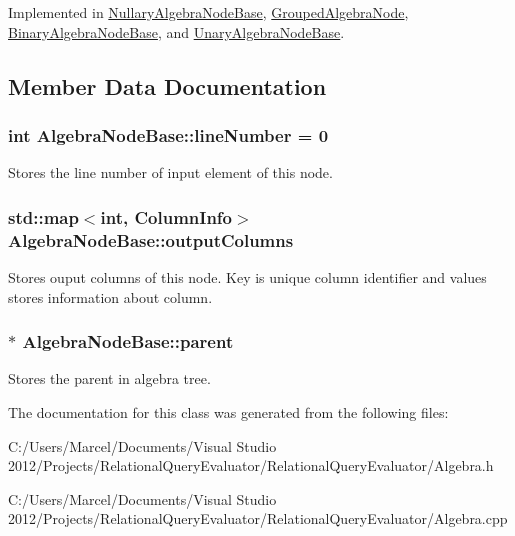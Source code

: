 Implemented in \hyperlink{class_nullary_algebra_node_base_af5a5e7f02db8509605ab852ef65b201b}{Nullary\+Algebra\+Node\+Base}, \hyperlink{class_grouped_algebra_node_a463e6303f6332fc9ed2a885e3456b58e}{Grouped\+Algebra\+Node}, \hyperlink{class_binary_algebra_node_base_a6e466b62966a9851c3c34e1fb588a496}{Binary\+Algebra\+Node\+Base}, and \hyperlink{class_unary_algebra_node_base_a26aeeaeb45f97051d618cfcceccd5949}{Unary\+Algebra\+Node\+Base}.



\subsection{Member Data Documentation}
\hypertarget{class_algebra_node_base_ac98b5887b911ee27411307c94db7fc94}{
\subsubsection[{line\+Number}]{\setlength{\rightskip}{0pt plus 5cm}int Algebra\+Node\+Base\+::line\+Number = 0}}\label{class_algebra_node_base_ac98b5887b911ee27411307c94db7fc94}
Stores the line number of input element of this node. \hypertarget{class_algebra_node_base_ac59c590aea4f109c7fab18f714c588c1}{
\subsubsection[{output\+Columns}]{\setlength{\rightskip}{0pt plus 5cm}std\+::map$<$int, {\bf Column\+Info}$>$ Algebra\+Node\+Base\+::output\+Columns}}\label{class_algebra_node_base_ac59c590aea4f109c7fab18f714c588c1}
Stores ouput columns of this node. Key is unique column identifier and values stores information about column. \hypertarget{class_algebra_node_base_a5b2834cce900dec172763d4ef4b38f66}{
\subsubsection[{parent}]{$\ast$ Algebra\+Node\+Base\+::parent}}\label{class_algebra_node_base_a5b2834cce900dec172763d4ef4b38f66}
Stores the parent in algebra tree. 

The documentation for this class was generated from the following files\+:\begin{DoxyCompactItemize}
\item 
C\+:/\+Users/\+Marcel/\+Documents/\+Visual Studio 2012/\+Projects/\+Relational\+Query\+Evaluator/\+Relational\+Query\+Evaluator/Algebra.\+h\item 
C\+:/\+Users/\+Marcel/\+Documents/\+Visual Studio 2012/\+Projects/\+Relational\+Query\+Evaluator/\+Relational\+Query\+Evaluator/Algebra.\+cpp\end{DoxyCompactItemize}
